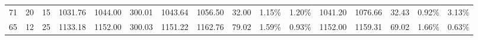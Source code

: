 \begin{tabular}{lllrrrrrrllrrrll}
71 &  20 &  15 &   1031.76 &    1044.00 &      300.01 &       1043.64 &        1056.50 &           32.00 &            1.15\% &             1.20\% &       1041.20 &        1076.66 &           32.43 &            0.92\% &             3.13\% \\
65 &  12 &  25 &   1133.18 &    1152.00 &      300.03 &       1151.22 &        1162.76 &           79.02 &            1.59\% &             0.93\% &       1152.00 &        1159.31 &           69.02 &            1.66\% &             0.63\% \\
\bottomrule
\end{tabular}

